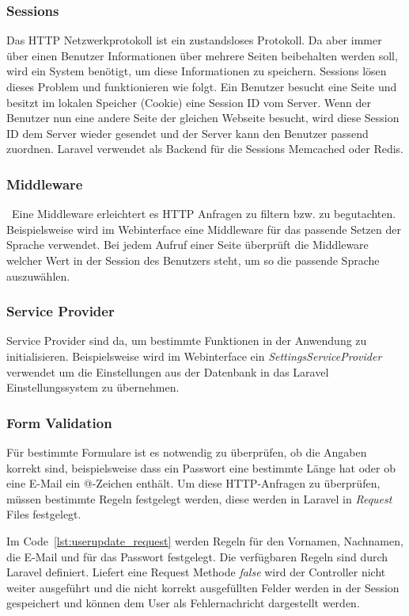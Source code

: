 \subsubsection{Sessions}
Das HTTP Netzwerkprotokoll ist ein zustandsloses Protokoll. Da aber immer über
einen Benutzer Informationen über mehrere Seiten beibehalten werden soll, wird
ein System benötigt, um diese Informationen zu speichern. Sessions lösen dieses
Problem und funktionieren wie folgt. Ein Benutzer besucht eine Seite und besitzt
im lokalen Speicher (Cookie) eine Session ID vom Server. Wenn der Benutzer nun
eine andere Seite der gleichen Webseite besucht, wird diese Session ID dem Server
wieder gesendet und der Server kann den Benutzer passend zuordnen. Laravel verwendet als Backend
für die Sessions Memcached oder Redis.

\subsubsection{Middleware}\
Eine Middleware erleichtert es HTTP Anfragen zu filtern bzw. zu begutachten.
Beispielsweise wird im Webinterface eine Middleware für das passende Setzen der
Sprache verwendet. Bei jedem Aufruf einer Seite überprüft die Middleware welcher
Wert in der Session des Benutzers steht, um so die passende Sprache auszuwählen.

\subsubsection{Service Provider}
Service Provider sind da, um bestimmte Funktionen in der Anwendung zu
initialisieren. Beispielsweise wird im Webinterface ein
\textit{SettingsServiceProvider} verwendet um die Einstellungen aus der Datenbank
in das Laravel Einstellungssystem zu übernehmen.

\subsubsection{Form Validation}
Für bestimmte Formulare ist es notwendig zu überprüfen, ob die Angaben korrekt
sind, beispielsweise dass ein Passwort eine bestimmte Länge hat oder ob eine
E-Mail ein @-Zeichen enthält. Um diese HTTP-Anfragen zu überprüfen, müssen bestimmte Regeln
festgelegt werden, diese werden in Laravel in \textit{Request} Files festgelegt.

Im Code~\ref{lst:userupdate_request} werden Regeln für den Vornamen, Nachnamen,
die E-Mail und für das Passwort festgelegt. Die verfügbaren Regeln sind durch
Laravel definiert. Liefert eine Request Methode \textit{false} wird der
Controller nicht weiter ausgeführt und die nicht korrekt ausgefüllten Felder
werden in der Session gespeichert und können dem User als Fehlernachricht
dargestellt werden.

